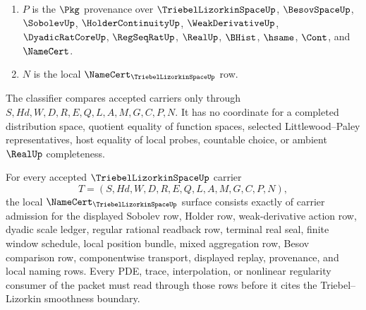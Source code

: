 \begin{definition}
\begin{enumerate}
$$$$
\item $P$ is the $\Pkg$ provenance over $\TriebelLizorkinSpaceUp$, $\BesovSpaceUp$, $\SobolevUp$, $\HolderContinuityUp$, $\WeakDerivativeUp$, $\DyadicRatCoreUp$, $\RegSeqRatUp$, $\RealUp$, $\BHist$, $\hsame$, $\Cont$, and $\NameCert$.
\item $N$ is the local $\NameCert_{\TriebelLizorkinSpaceUp}$ row.
\end{enumerate}
The classifier compares accepted carriers only through $S,Hd,W,D,R,E,Q,L,A,M,G,C,P,N$. It has no coordinate for a completed distribution space, quotient equality of function spaces, selected Littlewood--Paley representatives, host equality of local probes, countable choice, or ambient $\RealUp$ completeness.
\end{definition}

\begin{theorem}
\label{thm:triebel-lizorkin-space-namecert-obligations}
For every accepted $\TriebelLizorkinSpaceUp$ carrier
$$
T=(S,Hd,W,D,R,E,Q,L,A,M,G,C,P,N),
$$
the local $\NameCert_{\TriebelLizorkinSpaceUp}$ surface consists exactly of carrier admission for the displayed Sobolev row, Holder row, weak-derivative action row, dyadic scale ledger, regular rational readback row, terminal real seal, finite window schedule, local position bundle, mixed aggregation row, Besov comparison row, componentwise transport, displayed replay, provenance, and local naming rows. Every PDE, trace, interpolation, or nonlinear regularity consumer of the packet must read through those rows before it cites the Triebel--Lizorkin smoothness boundary.
\end{theorem}
